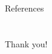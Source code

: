 \section[References]{}
\label{sec:references}
\begin{frame}[allowframebreaks]{References}
	\printbibliography
\end{frame}

\section[Thanks]{}
\label{sec:thanks}

\begin{frame}{Thank you!}
  
\end{frame}
